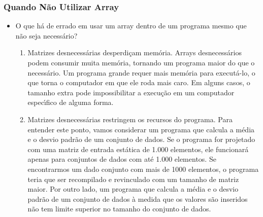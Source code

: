 \documentclass[notes=show]{beamer}
\newenvironment{stepenumerate}{\begin{enumerate}[<+->]}{\end{enumerate}}
\begin{document}
\begin{frame}%

\frametitle{Quando N\~{a}o Utilizar Array}

\begin{itemize}
\item O que h\'{a} de errado em usar um array dentro de um programa mesmo
que n\~{a}o seja necess\'{a}rio?

\begin{stepenumerate}
\item Matrizes desnecess\'{a}rias desperdi\c{c}am mem\'{o}ria. Arrays
desnecess\'{a}rios podem consumir muita mem\'{o}ria, tornando um programa
maior do que o necess\'{a}rio. Um programa grande requer mais mem\'{o}ria
para execut\'{a}-lo, o que torna o computador em que ele roda mais caro. Em
alguns casos, o tamanho extra pode impossibilitar a execu\c{c}\~{a}o em um
computador espec\'{\i}fico de alguma forma.

\item Matrizes desnecess\'{a}rias restringem os recursos do programa. Para
entender este ponto, vamos considerar um programa que calcula a m\'{e}dia e
o desvio padr\~{a}o de um conjunto de dados. Se o programa for projetado com
uma matriz de entrada est\'{a}tica de 1.000 elementos, ele funcionar\'{a}
apenas para conjuntos de dados com at\'{e} 1.000 elementos. Se encontrarmos
um dado conjunto com mais de 1000 elementos, o programa teria que ser
recompilado e revinculado com um tamanho de matriz maior. Por outro lado, um
programa que calcula a m\'{e}dia e o desvio padr\~{a}o de um conjunto de
dados \`{a} medida que os valores s\~{a}o inseridos n\~{a}o tem limite
superior no tamanho do conjunto de dados.
\end{stepenumerate}
\end{itemize}

\transboxout%
\end{frame}%
\end{document}
